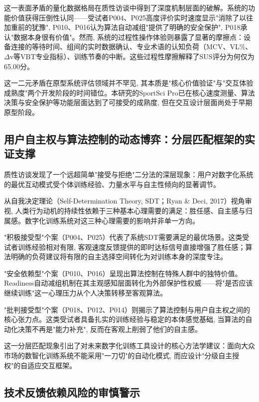 这一表面矛盾的量化数据格局在质性访谈中得到了深度机制层面的破解。系统的功能价值获得压倒性认同——受试者P004、P025高度评价实时速度显示"消除了以往加重前的犹豫", P010、P016认为算法自动减组"提供了明确的安全保护", P018承认"数据本身很有价值"。然而, 系统的过程性操作体验则暴露了显著的摩擦点：设备连接的等待时间、组间的实时数据确认、专业术语的认知负荷（MCV、VL\%、$\Delta$v等VBT专业指标）、训练节奏的中断。这些过程性摩擦解释了SUS评分为何仅为65.00分。

这一二元矛盾在原型系统评估领域并不罕见, 其本质是"核心价值验证"与"交互体验成熟度"两个开发阶段的时间错位。本研究的SportSci Pro已在核心速度测量、算法决策与安全保护等功能层面达到了可接受的成熟度, 但在交互设计层面尚处于早期原型阶段。

\subsection{用户自主权与算法控制的动态博弈：分层匹配框架的实证支撑}
\label{sec:autonomy_algorithm}

质性访谈发现了一个远超简单"接受与拒绝"二分法的深层现象：用户对数字化系统的最优互动模式受个体训练经验、力量水平与自主性倾向的显著调节。

从自我决定理论（Self-Determination Theory, SDT；Ryan \& Deci, 2017）视角审视, 人类行为动机的持续性依赖于三种基本心理需要的满足：胜任感、自主感与归属感。数字化训练系统对这三种心理需要的影响并非单一方向。

"积极接受型"个案（P004、P025）代表了系统SDT需要满足的最优场景。这类受试者训练经验相对有限, 客观速度反馈提供的即时达标信号直接增强了胜任感；算法明确的负荷建议将有限的自主选择空间转化为对训练本身的深度专注。

"安全依赖型"个案（P010、P016）呈现出算法控制在特殊人群中的独特价值。Readiness自动减组机制在其主观感知层面转化为外部保护性权威——将"是否应该继续训练"这一心理压力从个人决策转移至客观算法。

"批判接受型"个案（P018、P012、P014）则揭示了算法控制与用户自主权之间的核心张力点。这类受试者具备扎实的训练经验与稳定的本体感觉基础, 当算法的自动化决策不再是"能力补充", 反而在客观上削弱了他们的自主感。

这一分层匹配现象引出了对未来数字化训练工具设计的核心方法学建议：面向大众市场的数智化训练系统不能采用"一刀切"的自动化模式, 而应设计"分级自主授权"的自适应交互框架。

\subsection{技术反馈依赖风险的审慎警示}
\label{sec:feedback_dependency}

